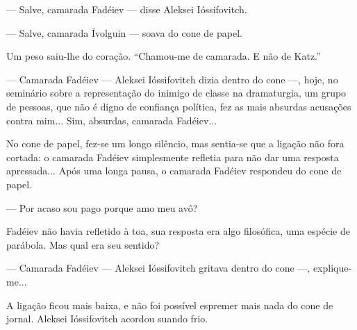 --- Salve, camarada Fadéiev --- disse Aleksei Ióssifovitch.

--- Salve, camarada Ívolguin --- soava do cone de papel.

Um peso saiu-lhe do coração. ``Chamou-me de camarada. E não de Katz.''

--- Camarada Fadéiev --- Aleksei Ióssifovitch dizia dentro do cone ---,
hoje, no seminário sobre a representação do inimigo de classe na
dramaturgia, um grupo de pessoas, que não é digno de confiança política,
fez as mais absurdas acusações contra mim... Sim, absurdas, camarada
Fadéiev...

No cone de papel, fez-se um longo silêncio, mas sentia-se que a ligação
não fora cortada: o camarada Fadéiev simplesmente refletia para não dar
uma resposta apressada... Após uma longa pausa, o camarada Fadéiev
respondeu do cone de papel.

--- Por acaso sou pago porque amo meu avô?

Fadéiev não havia refletido à toa, sua resposta era algo filosófica, uma
espécie de parábola. Mas qual era seu sentido?

--- Camarada Fadéiev --- Aleksei Ióssifovitch gritava dentro do cone
---, explique-me...

A ligação ficou mais baixa, e não foi possível espremer mais nada do
cone de jornal. Aleksei Ióssifovitch acordou suando frio.

